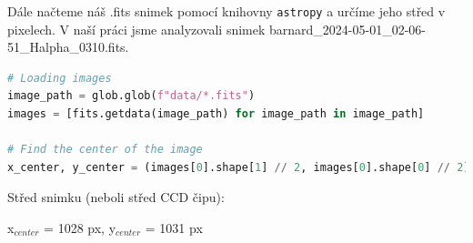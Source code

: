\documentclass[a4paper,11pt]{article}
\begin{document}
\begin{minipage}[t]{0.5\textwidth}
                \par Dále načteme náš .fits snimek pomocí knihovny \texttt{astropy} a určíme jeho střed v pixelech. V naší práci jsme analyzovali snimek barnard\_2024-05-01\_02-06-51\_Halpha\_0310.fits.

\begin{lstlisting}[language=Python]
# Loading images
image_path = glob.glob(f"data/*.fits")
images = [fits.getdata(image_path) for image_path in image_path]

# Find the center of the image
x_center, y_center = (images[0].shape[1] // 2, images[0].shape[0] // 2)
\end{lstlisting}

                Střed snimku (neboli střed CCD čipu):
                \begin{center}
                    x$_{center}$ = 1028 px, y$_{center}$ = 1031 px
                \end{center}

    \end{minipage}
    \hspace{10pt}
\end{document}
